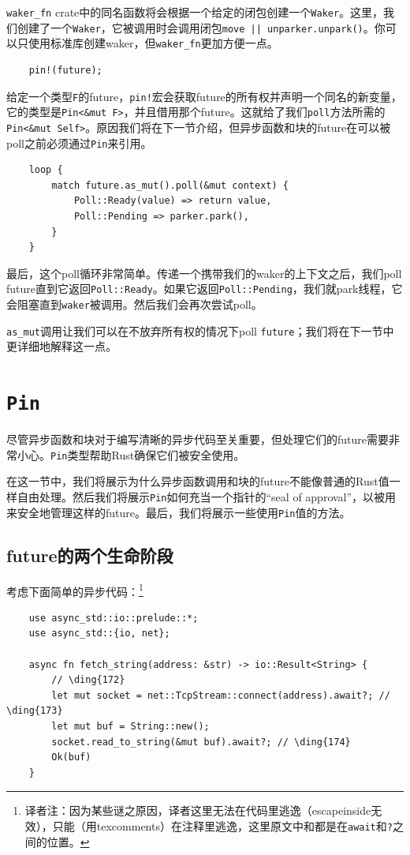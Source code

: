 \texttt{waker\_fn} crate中的同名函数将会根据一个给定的闭包创建一个\texttt{Waker}。这里，我们创建了一个\texttt{Waker}，它被调用时会调用闭包\texttt{move || unparker.unpark()}。你可以只使用标准库创建waker，但\texttt{waker\_fn}更加方便一点。

\begin{verbatim}
    pin!(future);
\end{verbatim}
给定一个类型\texttt{F}的future，\texttt{pin!}宏会获取future的所有权并声明一个同名的新变量，它的类型是\texttt{Pin<\&mut F>}，并且借用那个future。这就给了我们\texttt{poll}方法所需的\texttt{Pin<\&mut Self>}。原因我们将在下一节介绍，但异步函数和块的future在可以被poll之前必须通过\texttt{Pin}来引用。

\begin{verbatim}
    loop {
        match future.as_mut().poll(&mut context) {
            Poll::Ready(value) => return value,
            Poll::Pending => parker.park(),
        }
    }
\end{verbatim}

最后，这个poll循环非常简单。传递一个携带我们的waker的上下文之后，我们poll future直到它返回\texttt{Poll::Ready}。如果它返回\texttt{Poll::Pending}，我们就park线程，它会阻塞直到\texttt{waker}被调用。然后我们会再次尝试poll。

\texttt{as\_mut}调用让我们可以在不放弃所有权的情况下poll \texttt{future}；我们将在下一节中更详细地解释这一点。

\section{\texttt{Pin}}

尽管异步函数和块对于编写清晰的异步代码至关重要，但处理它们的future需要非常小心。\texttt{Pin}类型帮助Rust确保它们被安全使用。

在这一节中，我们将展示为什么异步函数调用和块的future不能像普通的Rust值一样自由处理。然后我们将展示\texttt{Pin}如何充当一个指针的“seal of approval”，以被用来安全地管理这样的future。最后，我们将展示一些使用\texttt{Pin}值的方法。

\subsection{future的两个生命阶段}
考虑下面简单的异步代码：\footnote{译者注：因为某些谜之原因，译者这里无法在代码里逃逸（escapeinside无效），只能（用texcomments）在注释里逃逸，这里原文中和都是在\texttt{await}和\texttt{?}之间的位置。}
\begin{verbatim}
    use async_std::io::prelude::*;
    use async_std::{io, net};

    async fn fetch_string(address: &str) -> io::Result<String> {
        // \ding{172}
        let mut socket = net::TcpStream::connect(address).await?; // \ding{173}
        let mut buf = String::new();
        socket.read_to_string(&mut buf).await?; // \ding{174}
        Ok(buf)
    }
\end{verbatim}

